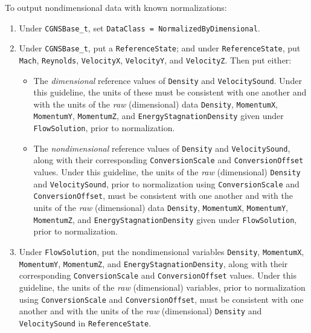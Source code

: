 \documentclass[12pt]{article}
\begin{document}
 \label{sec:normdimdata}

To output nondimensional data with known normalizations:

\begin{enumerate}
\item Under {\tt CGNSBase\_t}, set {\tt DataClass = NormalizedByDimensional}.

\item Under {\tt CGNSBase\_t}, put a {\tt ReferenceState}; and under
{\tt ReferenceState}, put {\tt Mach}, {\tt Reynolds},
{\tt VelocityX}, {\tt VelocityY}, and {\tt VelocityZ}.  Then put either:

\begin{itemize}
\item The {\it dimensional} reference
values of {\tt Density} and {\tt VelocitySound}.
Under this guideline, the units of these
must be consistent with one another and with the units of the {\it raw} (dimensional) data
{\tt Density}, {\tt MomentumX}, {\tt MomentumY},
{\tt MomentumZ}, and {\tt EnergyStagnationDensity} given
under {\tt FlowSolution}, prior to normalization.

\item The {\it nondimensional} reference
values of {\tt Density} and {\tt VelocitySound}, along with
their corresponding {\tt ConversionScale} and {\tt ConversionOffset}
values.
Under this guideline, the units of the {\it raw} (dimensional) 
{\tt Density} and {\tt VelocitySound},
prior to normalization using {\tt ConversionScale} and {\tt ConversionOffset},
must be consistent with one another and with the 
units of the {\it raw} (dimensional) data
{\tt Density}, {\tt MomentumX}, {\tt MomentumY},
{\tt MomentumZ}, and {\tt EnergyStagnationDensity} given
under {\tt FlowSolution}, prior to normalization.

\end{itemize}
 
\item Under {\tt FlowSolution}, put the nondimensional variables
{\tt Density}, {\tt MomentumX}, {\tt MomentumY},
{\tt MomentumZ}, and {\tt EnergyStagnationDensity}, along with
their corresponding {\tt ConversionScale} and {\tt ConversionOffset}
values.
Under this guideline, the units of the {\it raw} (dimensional)
variables, prior to normalization using {\tt ConversionScale} and {\tt ConversionOffset},
must be consistent with one another and with the
units of the {\it raw} (dimensional) {\tt Density} and {\tt VelocitySound}
in {\tt ReferenceState}.

\end{enumerate}
\end{document}
